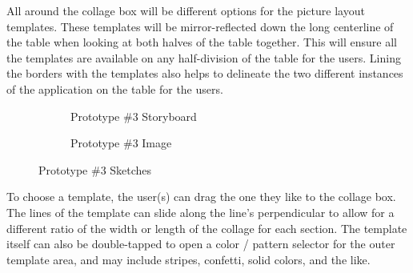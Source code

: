\documentclass{tei2013}
\begin{document}
All around the collage box will be different options for the picture layout templates.  These templates will be mirror-reflected down the long centerline of the table when looking at both halves of the table together.  This will ensure all the templates are available on any half-division of the table for the users.  Lining the borders with the templates also helps to delineate the two different instances of the application on the table for the users.
\begin{figure}[htb]
\centering
\begin{subfigure}[b]{.48\textwidth}
\centering
{}
\caption{Prototype \#3 Storyboard}
\label{fig:story3}
\end{subfigure}
\begin{subfigure}[b]{.48\textwidth}
\centering
{}
\caption{Prototype \#3 Image}
\label{fig:prot3}
\end{subfigure}

\caption{Prototype \#3 Sketches}
\end{figure}

To choose a template, the user(s) can drag the one they like to the collage box.  The lines of the template can slide along the line's perpendicular to allow for a different ratio of the width or length of the collage for each section.  The template itself can also be double-tapped to open a color / pattern selector for the outer template area, and may include stripes, confetti, solid colors, and the like.
\end{document}
